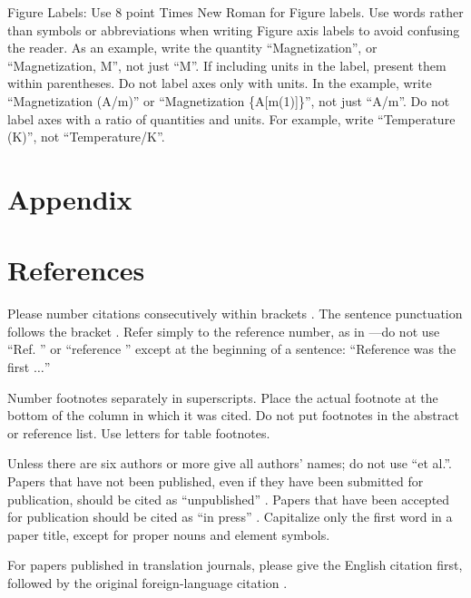\documentclass[conference]{IEEEtran}
\begin{document}
Figure Labels: Use 8 point Times New Roman for Figure labels. Use words 
rather than symbols or abbreviations when writing Figure axis labels to 
avoid confusing the reader. As an example, write the quantity 
``Magnetization'', or ``Magnetization, M'', not just ``M''. If including 
units in the label, present them within parentheses. Do not label axes only 
with units. In the example, write ``Magnetization (A/m)'' or ``Magnetization 
\{A[m(1)]\}'', not just ``A/m''. Do not label axes with a ratio of 
quantities and units. For example, write ``Temperature (K)'', not 
``Temperature/K''.


\section*{Appendix}\label{APDX}

\section*{References}

Please number citations consecutively within brackets \cite{b1}. The 
sentence punctuation follows the bracket \cite{b2}. Refer simply to the reference 
number, as in \cite{b3}---do not use ``Ref. \cite{b3}'' or ``reference \cite{b3}'' except at 
the beginning of a sentence: ``Reference \cite{b3} was the first $\ldots$''

Number footnotes separately in superscripts. Place the actual footnote at 
the bottom of the column in which it was cited. Do not put footnotes in the 
abstract or reference list. Use letters for table footnotes.

Unless there are six authors or more give all authors' names; do not use 
``et al.''. Papers that have not been published, even if they have been 
submitted for publication, should be cited as ``unpublished'' \cite{b4}. Papers 
that have been accepted for publication should be cited as ``in press'' \cite{b5}. 
Capitalize only the first word in a paper title, except for proper nouns and 
element symbols.

For papers published in translation journals, please give the English 
citation first, followed by the original foreign-language citation \cite{b6}.
\end{document}
